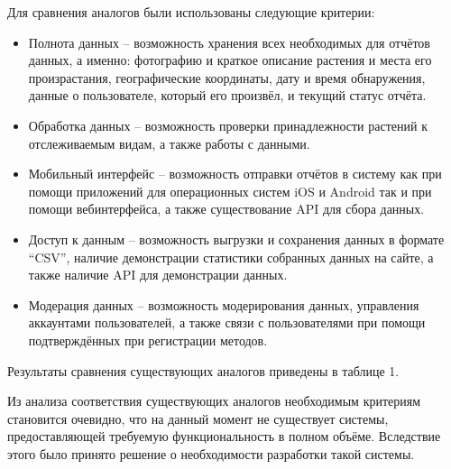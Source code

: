 \nwln
Для сравнения аналогов были использованы следующие критерии:

\begin{itemize}[topsep=0pt, parsep=0pt, itemsep=0pt, wide=0.5cm]
	\item Полнота данных -- возможность хранения всех необходимых для отчётов данных, а именно: фотографию и краткое описание растения и места его произрастания, географические координаты, дату и время обнаружения, данные о пользователе, который его произвёл, и текущий статус отчёта.
	\item Обработка данных -- возможность проверки принадлежности растений к отслеживаемым видам, а также работы с данными.
	\item Мобильный интерфейс -- возможность отправки отчётов в систему как при помощи приложений для операционных систем iOS и Android так и при помощи вебинтерфейса, а также существование API для сбора данных.
	\item Доступ к данным -- возможность выгрузки и сохранения данных в формате “CSV”, наличие демонстрации статистики собранных данных на сайте, а также наличие API для демонстрации данных.
	\item Модерация данных -- возможность модерирования данных, управления аккаунтами пользователей, а также связи с пользователями при помощи подтверждённых при регистрации методов.
\end{itemize}

\nwln
Результаты сравнения существующих аналогов приведены в таблице 1. \\
\tableone

\nwln
Из анализа соответствия существующих аналогов необходимым критериям становится очевидно, что на данный момент не существует системы, предоставляющей требуемую функциональность в полном объёме.
Вследствие этого было принято решение о необходимости разработки такой системы.
